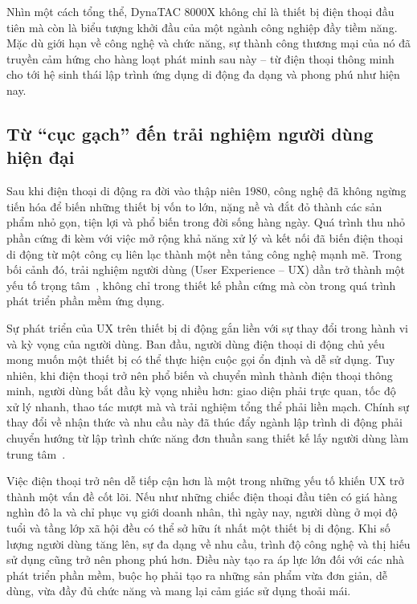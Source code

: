\begin{flushleft}
  \hspace*{0.8cm}Nhìn một cách tổng thể, DynaTAC 8000X không chỉ là thiết bị điện thoại đầu tiên mà còn là biểu tượng khởi đầu của một ngành công nghiệp đầy tiềm năng. Mặc dù giới hạn về công nghệ và chức năng, sự thành công thương mại của nó đã truyền cảm hứng cho hàng loạt phát minh sau này – từ điện thoại thông minh cho tới hệ sinh thái lập trình ứng dụng di động đa dạng và phong phú như hiện nay.
\end{flushleft}

\subsection{Từ “cục gạch” đến trải nghiệm người dùng hiện đại}
\renewcommand{\labelitemi}{--}    
    \begin{flushleft}
        \hspace*{0.8cm}Sau khi điện thoại di động ra đời vào thập niên 1980, công nghệ đã không ngừng tiến hóa để biến những thiết bị vốn to lớn, nặng nề và đắt đỏ thành các sản phẩm nhỏ gọn, tiện lợi và phổ biến trong đời sống hàng ngày. Quá trình thu nhỏ phần cứng đi kèm với việc mở rộng khả năng xử lý và kết nối đã biến điện thoại di động từ một công cụ liên lạc thành một nền tảng công nghệ mạnh mẽ. Trong bối cảnh đó, trải nghiệm người dùng (User Experience – UX) dần trở thành một yếu tố trọng tâm~\cite{uxmobile}, không chỉ trong thiết kế phần cứng mà còn trong quá trình phát triển phần mềm ứng dụng.
    \end{flushleft}

    \begin{flushleft}
      \hspace*{0.8cm}Sự phát triển của UX trên thiết bị di động gắn liền với sự thay đổi trong hành vi và kỳ vọng của người dùng. Ban đầu, người dùng điện thoại di động chủ yếu mong muốn một thiết bị có thể thực hiện cuộc gọi ổn định và dễ sử dụng. Tuy nhiên, khi điện thoại trở nên phổ biến và chuyển mình thành điện thoại thông minh, người dùng bắt đầu kỳ vọng nhiều hơn: giao diện phải trực quan, tốc độ xử lý nhanh, thao tác mượt mà và trải nghiệm tổng thể phải liền mạch. Chính sự thay đổi về nhận thức và nhu cầu này đã thúc đẩy ngành lập trình di động phải chuyển hướng từ lập trình chức năng đơn thuần sang thiết kế lấy người dùng làm trung tâm~\cite{mobileexpectations}.
    \end{flushleft}

    \begin{flushleft}
      \hspace*{0.8cm}Việc điện thoại trở nên dễ tiếp cận hơn là một trong những yếu tố khiến UX trở thành một vấn đề cốt lõi. Nếu như những chiếc điện thoại đầu tiên có giá hàng nghìn đô la và chỉ phục vụ giới doanh nhân, thì ngày nay, người dùng ở mọi độ tuổi và tầng lớp xã hội đều có thể sở hữu ít nhất một thiết bị di động. Khi số lượng người dùng tăng lên, sự đa dạng về nhu cầu, trình độ công nghệ và thị hiếu sử dụng cũng trở nên phong phú hơn. Điều này tạo ra áp lực lớn đối với các nhà phát triển phần mềm, buộc họ phải tạo ra những sản phẩm vừa đơn giản, dễ dùng, vừa đầy đủ chức năng và mang lại cảm giác sử dụng thoải mái.
  \end{flushleft}

